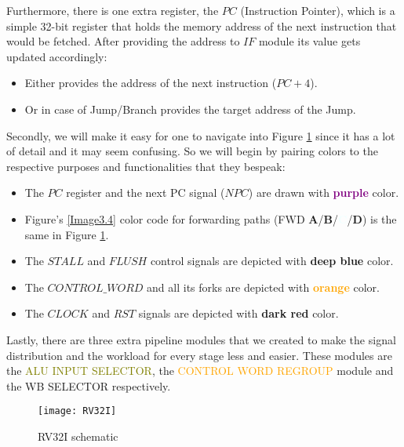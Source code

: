 Furthermore, there is one extra register, the $PC$ (Instruction Pointer), which is a simple 32-bit register that holds the memory address of the next instruction that would be fetched. After providing the address to $IF$ module its value gets updated accordingly:
\vspace{2mm}
\begin{itemize}
	\item Either provides the address of the next instruction ($PC+4$).
	\item Or in case of Jump/Branch provides the target address of the Jump.
\end{itemize}
\vspace{2mm}
Secondly,  we will make it easy for one to navigate into Figure \ref{Image3.14} since it has a lot of detail and it may seem confusing. So we will begin by pairing colors to the respective purposes and functionalities that they bespeak: 
\vspace{2mm}
\begin{itemize}
	\item The $PC$ register and the next PC signal ($NPC$) are drawn with \textcolor{purple}{\textbf{purple}} color.
	\item Figure's \ref{Image3.4} color code for forwarding paths (FWD \textcolor{forestgreen(web)}{\textbf{A}}/\textcolor{bred}{\textbf{B}}/\textcolor{azure}{\textbf{C}}/\textcolor{citrine}{\textbf{D}}) is the same in Figure \ref{Image3.14}.
	\item The $STALL$ and $FLUSH$ control signals are depicted with \textcolor{ao}{\textbf{deep blue}} color.
	\item The $CONTROL\_WORD$ and all its forks are depicted with \textcolor{orange}{\textbf{orange}} color.
	\item The $CLOCK$ and $RST$ signals are depicted with \textcolor{burgundy}{\textbf{dark red}} color.
\end{itemize}
\vspace{2mm}

Lastly, there are three extra pipeline modules that we created to make the signal distribution and the workload for every stage less and easier. These modules are the \textcolor{olive}{ALU INPUT SELECTOR}, the \textcolor{orange}{CONTROL WORD REGROUP} module and the \textcolor{burgundy}{WB SELECTOR} respectively.
\clearpage
\begin{figure}[h!]
	\begin{center}
		\texttt{[image: RV32I]}
		\caption{RV32I schematic}
		\label{Image3.14}
	\end{center}
\end{figure}
\clearpage

